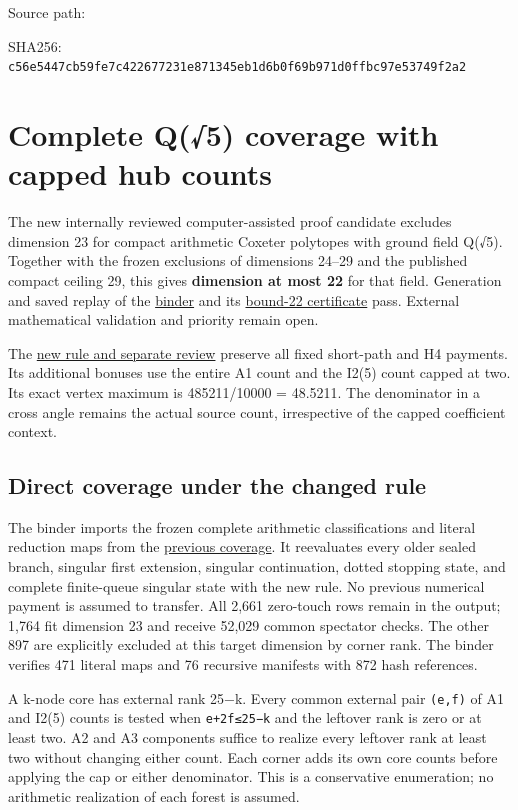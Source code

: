 \documentclass[
  10pt,
]{report}
\begin{document}
Source path: 

SHA256:
\nolinkurl{c56e5447cb59fe7c422677231e871345eb1d6b0f69b971d0ffbc97e53749f2a2}

\chapter{Complete Q(√5) coverage with capped hub
counts}\label{complete-q5-coverage-with-capped-hub-counts}

The new internally reviewed computer-assisted proof candidate excludes
dimension 23 for compact arithmetic Coxeter polytopes with ground field
Q(√5). Together with the frozen exclusions of dimensions 24--29 and the
published compact ceiling 29, this gives \textbf{dimension at most 22}
for that field. Generation and saved replay of the
\href{../scripts/fresh_sqrt5_hub_count_coverage_20261016.py}{binder} and
its \href{fresh_sqrt5_hub_count_coverage_20261016_bound22.json}{bound-22
certificate} pass. External mathematical validation and priority remain
open.

The \href{fresh_sqrt5_hub_count_weights_20261016_review.md}{new rule and
separate review} preserve all fixed short-path and H4 payments. Its
additional bonuses use the entire A1 count and the I2(5) count capped at
two. Its exact vertex maximum is 485211/10000 = 48.5211. The denominator
in a cross angle remains the actual source count, irrespective of the
capped coefficient context.

\section{Direct coverage under the changed
rule}\label{direct-coverage-under-the-changed-rule}

The binder imports the frozen complete arithmetic classifications and
literal reduction maps from the
\href{fresh_sqrt5_dimension23_coverage_20261015.md}{previous coverage}.
It reevaluates every older sealed branch, singular first extension,
singular continuation, dotted stopping state, and complete finite-queue
singular state with the new rule. No previous numerical payment is
assumed to transfer. All 2,661 zero-touch rows remain in the output;
1,764 fit dimension 23 and receive 52,029 common spectator checks. The
other 897 are explicitly excluded at this target dimension by corner
rank. The binder verifies 471 literal maps and 76 recursive manifests
with 872 hash references.

A k-node core has external rank 25−k. Every common external pair
\texttt{(e,f)} of A1 and I2(5) counts is tested when \texttt{e+2f≤25−k}
and the leftover rank is zero or at least two. A2 and A3 components
suffice to realize every leftover rank at least two without changing
either count. Each corner adds its own core counts before applying the
cap or either denominator. This is a conservative enumeration; no
arithmetic realization of each forest is assumed.
\end{document}
